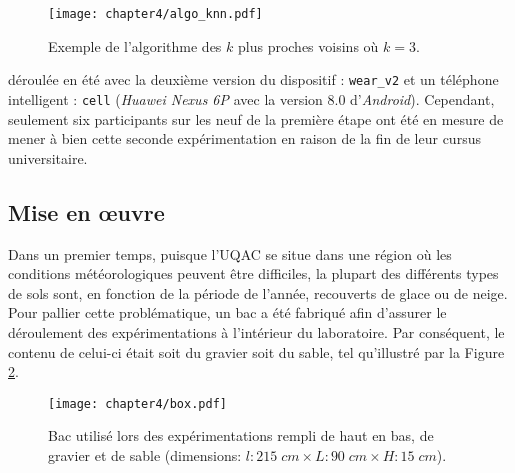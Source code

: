 \begin{figure}[H]
	\centering
	\texttt{[image: chapter4/algo\_knn.pdf]}
        \caption{Exemple de l'algorithme des $k$ plus proches voisins où $k=3$.}
	\label{fig:algo_knn}
\end{figure}

\noindent déroulée en été avec la deuxième version du dispositif : \texttt{wear\_v2} et un téléphone intelligent : \texttt{cell} (\textit{Huawei Nexus 6P} avec la version $8.0$ d'\textit{Android}). Cependant, seulement six participants sur les neuf de la première étape ont été en mesure de mener à bien cette seconde expérimentation en raison de la fin de leur cursus universitaire.

\subsection{Mise en \oe{}uvre}

Dans un premier temps, puisque l'\acs{UQAC} se situe dans une région où les conditions météorologiques peuvent être difficiles, la plupart des différents types de sols sont, en fonction de la période de l'année, recouverts de glace ou de neige. Pour pallier cette problématique, un bac a été fabriqué afin d'assurer le déroulement des expérimentations à l'intérieur du laboratoire. Par conséquent, le contenu de celui-ci était soit du gravier soit du sable, tel qu'illustré par la Figure \ref{fig:box}.

\begin{figure}[H]
	\centering
	\texttt{[image: chapter4/box.pdf]}
        \caption{Bac utilisé lors des expérimentations rempli de haut en bas, de gravier et de sable (dimensions: $l : 215\; cm \times L : 90\; cm \times H : 15\; cm$).}
	\label{fig:box}
\end{figure}

